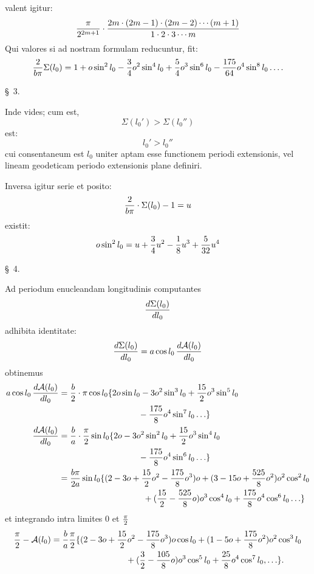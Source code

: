 valent igitur:
\[
 {\pi\over 2^{2m+1}}\cdot
 {2m\cdot(2m-1)\cdot(2m-2)\cdots(m+1)\over 1\cdot2\cdot3\cdots m}
\]
Qui valores si ad nostram formulam reducuntur, fit:
\[
 {2\over b\pi}\Sigma(l_0)=1+o\sin^2l_0-{3\over4}o^2\sin^4l_0+{5\over4}o^3\sin^6l_0-{175\over64}o^4\sin^8l_0\ldots .
\]

\begin{center}\S\ 3.\end{center}

Inde vides; cum est,
\[
 \Sigma(l_0')>\Sigma(l_0'')
\]
est:
\[
 l_0'>l_0''
\]
cui consentaneum est $l_0$ uniter aptam esse functionem periodi extensionis, vel lineam geodeticam periodo extensionis plane definiri.

Inversa igitur serie et posito:
\[
 {2\over b\pi}\cdot\Sigma(l_0)-1=u
\]
existit:
\[
 o\sin^2l_0=u+{3\over4}u^2-{1\over8}u^3+{5\over32}u^4
\]

\begin{center}\S\ 4.\end{center}

Ad periodum enucleandam longitudinis computantes
\[
 {d\Sigma(l_0)\over dl_0}
\]
adhibita identitate:
\[
 {d\Sigma(l_0)\over dl_0}=a\cos l_0\,{d\mathcal A(l_0)\over dl_0}
\]
obtinemus
\[
\begin{aligned}
 a\cos l_0\,{d\mathcal A(l_0)\over dl_0}
 &= {b\over2}\cdot\pi\cos l_0\{2o\sin l_0-3o^2\sin^3l_0+{15\over2}o^3\sin^5l_0\\
 &\hspace{33mm}{}-{175\over8}o^4\sin^7l_0\ldots\}\\
 {d\mathcal A(l_0)\over dl_0}
 &= {b\over a}\cdot{\pi\over2}\sin l_0\{2o-3o^2\sin^2l_0+{15\over2}o^3\sin^4l_0\\
 &\hspace{33mm}{}-{175\over8}o^4\sin^6l_0\ldots\}\\
 &= {b\pi\over2a}\sin l_0\{(2-3o+{15\over2}o^2-{175\over8}o^3)o+(3-15o+{525\over8}o^2)o^2\cos^2l_0\\
 &\hspace{35mm}{}+({15\over2}-{525\over8}o)o^3\cos^4l_0+{175\over8}o^4\cos^6l_0\ldots\}
\end{aligned}
\]
et integrando intra limites $0$ et ${\pi\over2}$
\[
\begin{aligned}
 {\pi\over2}-\mathcal A(l_0)&={b\over a}{\pi\over2}\{(2-3o+{15\over2}o^2-{175\over8}o^3)o\cos l_0+(1-5o+{175\over8}o^2)o^2\cos^3l_0\\
&\hspace{31mm}{}+({3\over2}-{105\over8}o)o^3\cos^5l_0+{25\over8}o^4\cos^7l_0,\ldots\}.
\end{aligned}
\]
